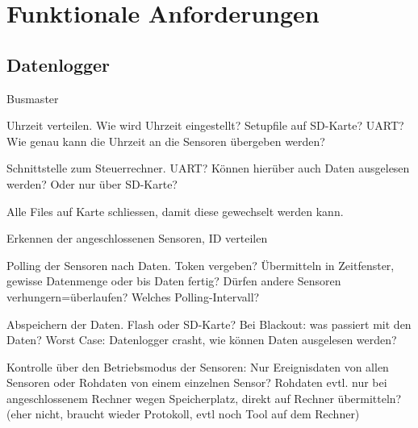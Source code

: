 %
%

\thispagestyle{empty}
\chapter*{Funktionale Anforderungen}\label{chap.funktionale}
\section{Datenlogger}
Busmaster

Uhrzeit verteilen. Wie wird Uhrzeit eingestellt? Setupfile auf SD-Karte? UART? Wie genau kann die Uhrzeit an die Sensoren übergeben werden?

Schnittstelle zum Steuerrechner. UART? Können hierüber auch Daten ausgelesen werden? Oder nur über SD-Karte?

Alle Files auf Karte schliessen, damit diese gewechselt werden kann.

Erkennen der angeschlossenen Sensoren, ID verteilen

Polling der Sensoren nach Daten. Token vergeben? Übermitteln in Zeitfenster, gewisse Datenmenge oder bis Daten fertig? Dürfen andere Sensoren verhungern=überlaufen? Welches Polling-Intervall?

Abspeichern der Daten. Flash oder SD-Karte? Bei Blackout: was passiert mit den Daten? Worst Case: Datenlogger crasht, wie können Daten ausgelesen werden?

Kontrolle über den Betriebsmodus der Sensoren: Nur Ereignisdaten von allen Sensoren oder Rohdaten von einem einzelnen Sensor? Rohdaten evtl. nur bei angeschlossenem Rechner wegen Speicherplatz, direkt auf Rechner übermitteln? (eher nicht, braucht wieder Protokoll, evtl noch Tool auf dem Rechner)

